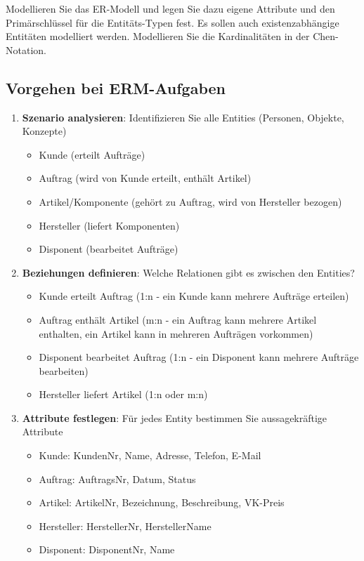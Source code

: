 \documentclass[a4paper]{article}
\begin{document}
Modellieren Sie das ER-Modell und legen Sie dazu eigene Attribute und den Primärschlüssel für die 
Entitäts-Typen fest. Es sollen auch existenzabhängige Entitäten modelliert werden. 
Modellieren Sie die Kardinalitäten in der Chen-Notation.

\subsection{Vorgehen bei ERM-Aufgaben}

\begin{enumerate}
    \item \textbf{Szenario analysieren}: Identifizieren Sie alle Entities (Personen, Objekte, Konzepte)
    \begin{itemize}
        \item Kunde (erteilt Aufträge)
        \item Auftrag (wird von Kunde erteilt, enthält Artikel)
        \item Artikel/Komponente (gehört zu Auftrag, wird von Hersteller bezogen)
        \item Hersteller (liefert Komponenten)
        \item Disponent (bearbeitet Aufträge)
    \end{itemize}
    
    \item \textbf{Beziehungen definieren}: Welche Relationen gibt es zwischen den Entities?
    \begin{itemize}
        \item Kunde erteilt Auftrag (1:n - ein Kunde kann mehrere Aufträge erteilen)
        \item Auftrag enthält Artikel (m:n - ein Auftrag kann mehrere Artikel enthalten, ein Artikel kann in mehreren Aufträgen vorkommen)
        \item Disponent bearbeitet Auftrag (1:n - ein Disponent kann mehrere Aufträge bearbeiten)
        \item Hersteller liefert Artikel (1:n oder m:n)
    \end{itemize}
    
    \item \textbf{Attribute festlegen}: Für jedes Entity bestimmen Sie aussagekräftige Attribute
    \begin{itemize}
        \item Kunde: KundenNr, Name, Adresse, Telefon, E-Mail
        \item Auftrag: AuftragsNr, Datum, Status
        \item Artikel: ArtikelNr, Bezeichnung, Beschreibung, VK-Preis
        \item Hersteller: HerstellerNr, HerstellerName
        \item Disponent: DisponentNr, Name
    \end{itemize}
    

\end{enumerate}
\end{document}
